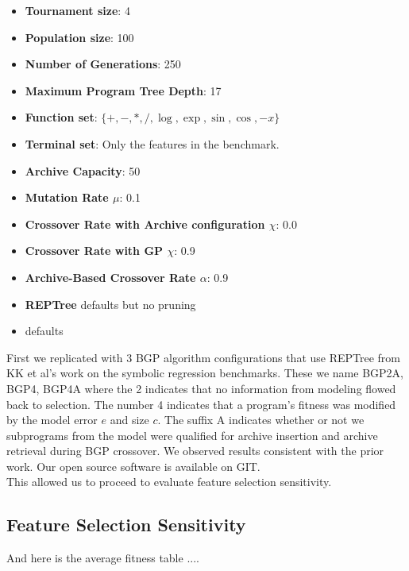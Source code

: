 \begin{itemize}
\item \textbf{Tournament size}: 4
\item \textbf{Population size}: 100
\item \textbf{Number of Generations}: 250
\item \textbf{Maximum Program Tree Depth}: 17
\item \textbf{Function set}: $\{ +, -, *, /, \log, \exp, \sin, \cos, -x \}$
\item \textbf{Terminal set}: Only the features in the benchmark.
\item \textbf{Archive Capacity}: 50
\item \textbf{Mutation Rate $\mu$}: 0.1
\item \textbf{Crossover Rate with Archive configuration $\chi$}: 0.0
\item \textbf{Crossover Rate with GP $\chi$}: 0.9
\item \textbf{Archive-Based Crossover Rate $\alpha$}: 0.9
\item \textbf{REPTree}  defaults but no pruning
\item \textbf{\SCIKIT} defaults
\end{itemize}

First we replicated with 3 BGP algorithm configurations that use REPTree from KK et al's work on the symbolic regression benchmarks. These we name BGP2A, BGP4, BGP4A where the 2 indicates that no information from modeling flowed back to selection. The number 4 indicates that a program's fitness was modified by the model error $e$ and size $c$.   The suffix A indicates whether or not we subprograms from the model were qualified for archive insertion and archive retrieval during BGP crossover. We observed results consistent with the prior work. Our open source software is available on GIT.\\

This allowed us to proceed to evaluate feature selection sensitivity.

\subsection{Feature Selection Sensitivity}\label{sect:ftr-select}


%

And here is the average fitness table ....



